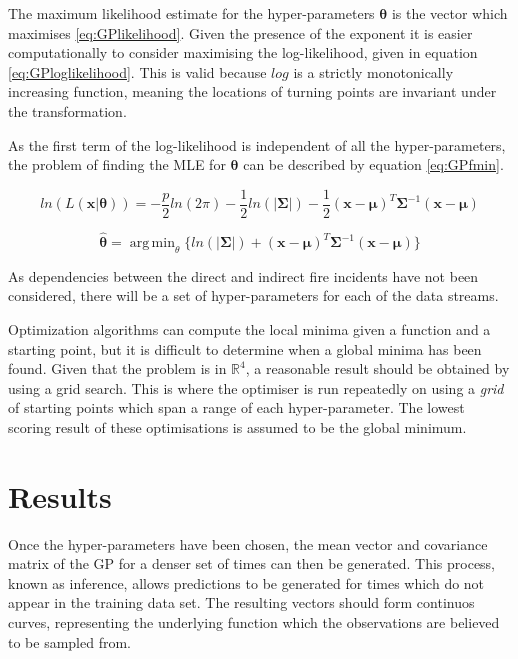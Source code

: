 \documentclass[a4paper,11pt]{report}
\DeclareMathOperator*{\argmin}{arg\,min}
\begin{document}
The maximum likelihood estimate for the hyper-parameters \(\mathbf{\theta}\) is the vector which maximises \ref{eq:GPlikelihood}. Given the presence of the exponent it is easier computationally to consider maximising the log-likelihood, given in equation \ref{eq:GPloglikelihood}. This is valid because \(log\) is a strictly monotonically increasing function, meaning the locations of turning points are invariant under the transformation. \par
As the first term of the log-likelihood is independent of all the hyper-parameters, the problem of finding the MLE for \(\boldsymbol{\theta}\) can be described by equation \ref{eq:GPfmin}.

\singlespacing

\begin{equation} \label{eq:GPloglikelihood}
ln(L(\mathbf{x} | \boldsymbol{\theta})) = - \frac{p}{2} ln(2\pi) - \frac{1}{2} ln(|\boldsymbol{\Sigma}|) - \frac{1}{2} (\mathbf{x}-\boldsymbol{\mu})^{T} \boldsymbol{\Sigma}^{-1}(\mathbf{x}-\boldsymbol{\mu})
\end{equation}

\begin{equation} \label{eq:GPfmin}
\hat{\boldsymbol{\theta}} = \argmin_\theta{\{ln(|\boldsymbol{\Sigma}|) +(\mathbf{x}-\boldsymbol{\mu})^{T}\boldsymbol{\Sigma}^{-1}(\mathbf{x}-\boldsymbol{\mu})}\}
\end{equation}

\doublespacing

As dependencies between the direct and indirect fire incidents have not been considered, there will be a set of hyper-parameters for each of the data streams. \par

Optimization algorithms can compute the local minima given a function and a starting point, but it is difficult to determine when a global minima has been found. Given that the problem is in \(\mathds{R}^4\), a reasonable result should be obtained by using a grid search. This is where the optimiser is run repeatedly on using a \textit{grid} of starting points which span a range of each hyper-parameter. The lowest scoring result of these optimisations is assumed to be the global minimum. \par

\section{Results}

Once the hyper-parameters have been chosen, the mean vector and covariance matrix of the GP for a denser set of times can then be generated. This process, known as inference, allows predictions to be generated for times which do not appear in the training data set. The resulting vectors should form continuos curves, representing the underlying function which the observations are believed to be sampled from. \par
\end{document}
